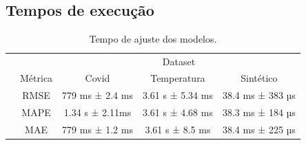 \begin{table}[!htp]
    \caption{}
    \label{tab:metrics}
    \setlength\extrarowheight{5pt}
    \begin{tabular}{|c|c|ccc|}
        
    \end{tabular}
\end{table}


\subsection{Tempos de execução}

\begin{table}[!htp]
    \caption{Tempo de ajuste dos modelos.}
    \setlength\extrarowheight{5pt}
    \begin{tabular}{|c|c|ccc|}
        \hline
        \rowcolor[HTML]{C0C0C0}
        \cellcolor[HTML]{C0C0C0}                          & \cellcolor[HTML]{C0C0C0}                          & \multicolumn{3}{c|}{\cellcolor[HTML]{C0C0C0}Dataset}                                                                                                                         \\ \cline{3-5}
        \rowcolor[HTML]{C0C0C0}
        \multirow{-2}{*}{\cellcolor[HTML]{C0C0C0}Modelo}  & \multirow{-2}{*}{\cellcolor[HTML]{C0C0C0}Métrica} & \multicolumn{1}{c|}{\cellcolor[HTML]{C0C0C0}Covid}                      & \multicolumn{1}{c|}{\cellcolor[HTML]{C0C0C0}Temperatura}               & Sintético                 \\ \hline
        \cellcolor[HTML]{C0C0C0}                          & RMSE                                              & \multicolumn{1}{c|}{779 ms ± 2.4 ms}                                    & \multicolumn{1}{c|}{3.61 s ± 5.34 ms}                                  & 38.4 ms ± 383 µs          \\ \cline{2-5}
        \rowcolor[HTML]{EFEFEF}
        \cellcolor[HTML]{C0C0C0}                          & MAPE                                              & \multicolumn{1}{c|}{\cellcolor[HTML]{EFEFEF}1.34 s ± 2.11ms}            & \multicolumn{1}{c|}{\cellcolor[HTML]{EFEFEF}3.61 s ± 4.68 ms}          & 38.3 ms ± 184 µs          \\ \cline{2-5}
        \cellcolor[HTML]{C0C0C0}                          & MAE                                               & \multicolumn{1}{c|}{779 ms ± 1.2 ms}                                    & \multicolumn{1}{c|}{3.61 s ± 8.5 ms}                                   & 38.4 ms ± 225 µs          \\ \cline{2-5}

\end{tabular}
\end{table}
